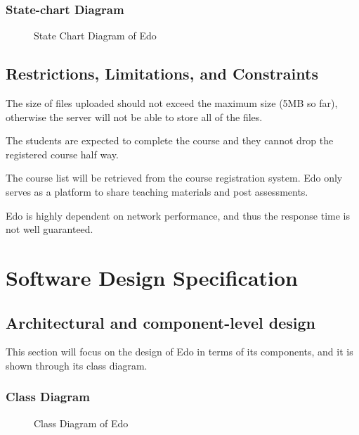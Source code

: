\documentclass[paper=a4, fontsize=11pt]{scrartcl}
\numberwithin{equation}{section}		%
\numberwithin{figure}{section}			%
\numberwithin{table}{section}				%
\begin{document}
\subsubsection{State-chart Diagram}
\begin{figure}[!ht]
	\begin{center}
	\end{center}
	\caption{State Chart Diagram of Edo}
\end{figure}


\subsection{Restrictions, Limitations, and Constraints}
The size of files uploaded should not exceed the maximum size (5MB so far), otherwise the server will not be able to store all of the files.

The students are expected to complete the course and they cannot drop the registered course half way.

The course list will be retrieved from the course registration system. Edo only serves as a platform to share teaching materials and post assessments.

Edo is highly dependent on network performance, and thus the response time is not well guaranteed.


\section{Software Design Specification}


\subsection{Architectural and component-level design}
This section will focus on the design of Edo in terms of its components, and it is shown through its class diagram.

\subsubsection{Class Diagram}

\begin{figure}[!ht]
	\begin{center}
	\end{center}
	\caption{Class Diagram of Edo}
\end{figure}
\end{document}
